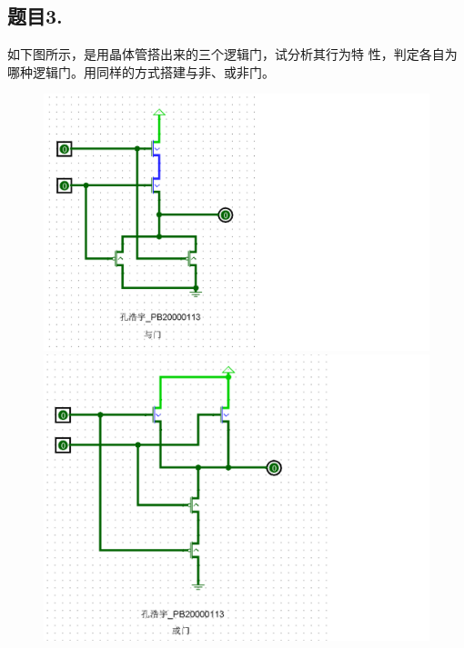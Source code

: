 \documentclass{article}
\begin{document}
		\subsection*{题目3.}如下图所示，是用晶体管搭出来的三个逻辑门，试分析其行为特
		性，判定各自为哪种逻辑门。用同样的方式搭建与非、或非门。
		\begin{figure}[htbp]
			\centering
			\begin{minipage}{0.49\linewidth}
				\centering
				\includegraphics[scale=0.5]{1-3-1.png}
			\end{minipage}
			\begin{minipage}{0.49\linewidth}
				\centering
				\includegraphics[scale=0.5]{1-3-2.png}
			\end{minipage}
		\end{figure}
		\clearpage
\end{document}
